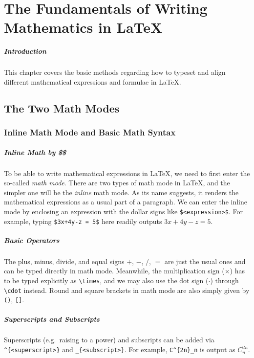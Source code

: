 \chapter{The Fundamentals of Writing Mathematics in \LaTeX{}}
\label{chap:maths}

\paragraph{Introduction}
This chapter covers the basic methods regarding how to typeset and align different mathematical expressions and formulae in \LaTeX{}.

\section{The Two Math Modes}

\subsection{Inline Math Mode and Basic Math Syntax}

\paragraph{Inline Math by \$\$}
To be able to write mathematical expressions in \LaTeX{}, we need to first enter the so-called \textit{math mode}. There are two types of math mode in \LaTeX{}, and the simpler one will be the \textit{inline} math mode. As its name suggests, it renders the mathematical expressions as a usual part of a paragraph. We can enter the inline mode by enclosing an expression with the dollar signs like \texttt{\$<expression>\$}. For example, typing \texttt{\$3x+4y-z = 5\$} here readily outputs $3x+4y-z = 5$.

\paragraph{Basic Operators}
The plus, minus, divide, and equal signs $+$, $-$, $/$, $=$ are just the usual ones and can be typed directly in math mode. Meanwhile, the multiplication sign ($\times$) has to be typed explicitly as \texttt{\textbackslash times}, and we may also use the dot sign ($\cdot$) through \texttt{\textbackslash cdot} instead. Round and square brackets in math mode are also simply given by \texttt{()}, \texttt{[]}.

\paragraph{Superscripts and Subscripts}
Superscripts (e.g.\ raising to a power) and subscripts can be added via \texttt{\^{}\{<superscript>\}} and \texttt{\_\{<subscript>\}}. For example, \verb|C^{2n}_n| is output as $C^{2n}_n$.

